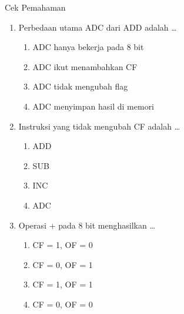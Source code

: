 \documentclass[aspectratio=169,11pt]{beamer}
\begin{document}
\begin{frame}{Cek Pemahaman}
\footnotesize
\begin{enumerate}
    \item Perbedaan utama ADC dari ADD adalah \dots
          \begin{enumerate}
              \item ADC hanya bekerja pada 8 bit
              \item ADC ikut menambahkan CF
              \item ADC tidak mengubah flag
              \item ADC menyimpan hasil di memori
          \end{enumerate}

    \vspace{0.2em}
    \item Instruksi yang tidak mengubah CF adalah \dots
          \begin{enumerate}
              \item ADD \quad \item SUB \quad
              \item INC \quad \item ADC
          \end{enumerate}

    \vspace{0.2em}
    \item Operasi  +  pada 8 bit menghasilkan \dots
          \begin{enumerate}
              \item CF = 1, OF = 0
              \item CF = 0, OF = 1
              \item CF = 1, OF = 1
              \item CF = 0, OF = 0
          \end{enumerate}
\end{enumerate}
\end{frame}
\end{document}
